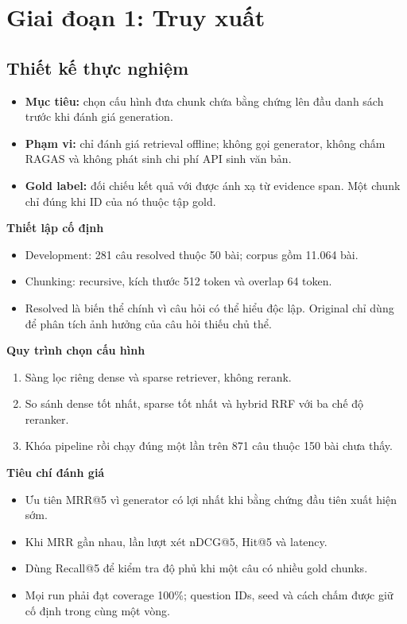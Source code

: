 \section{Giai đoạn 1: Truy xuất}

\subsection{Thiết kế thực nghiệm}

\begin{itemize}
  \item \textbf{Mục tiêu:} chọn cấu hình đưa chunk chứa bằng chứng lên đầu danh
  sách trước khi đánh giá generation.
  \item \textbf{Phạm vi:} chỉ đánh giá retrieval offline; không gọi generator,
  không chấm RAGAS và không phát sinh chi phí API sinh văn bản.
  \item \textbf{Gold label:} đối chiếu kết quả với 
  được ánh xạ từ evidence span. Một chunk chỉ đúng khi ID của nó thuộc tập gold.
\end{itemize}

\noindent\textbf{Thiết lập cố định}
\begin{itemize}
  \item Development: 281 câu resolved thuộc 50 bài; corpus gồm 11.064 bài.
  \item Chunking: recursive, kích thước 512 token và overlap 64 token.
  \item Resolved là biến thể chính vì câu hỏi có thể hiểu độc lập. Original chỉ
  dùng để phân tích ảnh hưởng của câu hỏi thiếu chủ thể.
\end{itemize}

\noindent\textbf{Quy trình chọn cấu hình}

\begin{enumerate}
  \item Sàng lọc riêng dense và sparse retriever, không rerank.
  \item So sánh dense tốt nhất, sparse tốt nhất và hybrid RRF với ba chế độ
        reranker.
  \item Khóa pipeline rồi chạy đúng một lần trên 871 câu thuộc 150 bài chưa
        thấy.
\end{enumerate}

\noindent\textbf{Tiêu chí đánh giá}
\begin{itemize}
  \item Ưu tiên MRR@5 vì generator có lợi nhất khi bằng chứng đầu tiên xuất hiện
  sớm.
  \item Khi MRR gần nhau, lần lượt xét nDCG@5, Hit@5 và latency.
  \item Dùng Recall@5 để kiểm tra độ phủ khi một câu có nhiều gold chunks.
  \item Mọi run phải đạt coverage 100\%; question IDs, seed và cách chấm được
  giữ cố định trong cùng một vòng.
\end{itemize}

